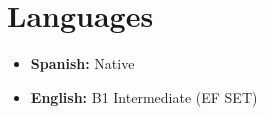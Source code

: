 \documentclass[11pt,a4paper,sans]{moderncv}
\begin{document}
\section{Languages}
\vspace{1pt}
\begin{itemize}
\item \textbf{Spanish:} Native
\item \textbf{English:} B1 Intermediate (EF SET)
\end{itemize}
\end{document}
